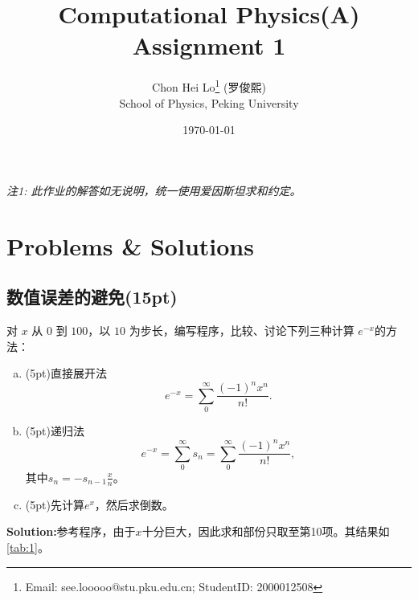 \documentclass[12pt, a4paper, oneside]{article}
\title{\textbf{Computational Physics(A) \\Assignment 1}}
\author{Chon Hei Lo\thanks{Email: see.looooo@stu.pku.edu.cn; StudentID: 2000012508} (罗俊熙) \\ School of Physics, Peking University}
\date{\today}
\begin{document}
\maketitle

\begin{center}
\textit{注1: 此作业的解答如无说明，统一使用爱因斯坦求和约定。}
\end{center}
\section{Problems \& Solutions}
\subsection{数值误差的避免(15pt)}
对 $x$ 从 $0$ 到 $100$，以 $10$ 为步长，编写程序，比较、讨论下列三种计算 $e^{-x}$的方法：
\begin{enumerate}[(a)]
\item (5pt)直接展开法
\begin{equation}\label{eq:1}
    e^{-x}=\sum_0^\infty{\frac{(-1)^nx^n}{n!}}.
\end{equation}
\item (5pt)递归法
\begin{equation}\label{eq:2}
    e^{-x}=\sum_0^\infty{s_n} = \sum_0^\infty{\frac{(-1)^nx^n}{n!}},
\end{equation}
其中$s_n=-s_{n-1}\frac{x}{n}$。
\item (5pt)先计算$e^x$，然后求倒数。
\end{enumerate}
\textbf{Solution:}参考程序，由于$x$十分巨大，因此求和部份只取至第10项。其结果如\autoref{tab:1}。
\end{document}
